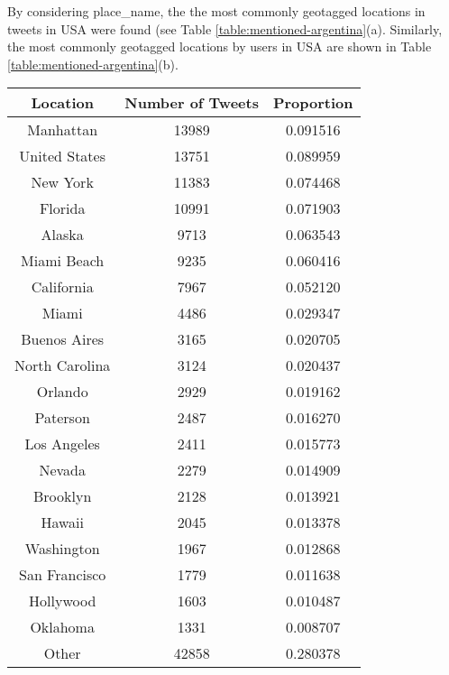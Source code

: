 By considering {\selectfont place\_name}, the the most commonly geotagged locations in tweets in USA were found (see Table \ref{table:mentioned-argentina}(a). Similarly, the most commonly geotagged locations by users in USA are shown in Table \ref{table:mentioned-argentina}(b).

\begin{table}
\centering
\begin{subtable}[c]{0.5\textwidth}
\centering
    \begin{tabular}{|c|c|c|}
    \hline
    Location & Number of Tweets & Proportion \\
    \hline
    Manhattan & 13989 & 0.091516 \\
    United States & 13751 & 0.089959 \\
    New York & 11383 & 0.074468 \\
    Florida & 10991 & 0.071903 \\
    Alaska & 9713 & 0.063543 \\
    Miami Beach & 9235 & 0.060416 \\
    California & 7967 & 0.052120 \\
    Miami & 4486 & 0.029347 \\
    Buenos Aires & 3165 & 0.020705 \\
    North Carolina & 3124 & 0.020437 \\
    Orlando & 2929 & 0.019162 \\
    Paterson & 2487 & 0.016270 \\
    Los Angeles & 2411 & 0.015773 \\
    Nevada & 2279 & 0.014909 \\
    Brooklyn & 2128 & 0.013921 \\
    Hawaii & 2045 & 0.013378 \\
    Washington & 1967 & 0.012868 \\
    San Francisco & 1779 & 0.011638 \\
    Hollywood & 1603 & 0.010487 \\
    Oklahoma & 1331 & 0.008707 \\
    Other & 42858 & 0.280378 \\
    \hline
    \end{tabular}
\end{subtable}


\end{table}
